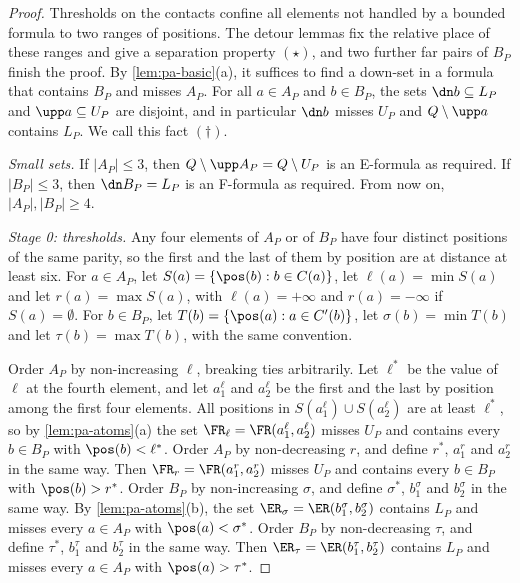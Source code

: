 \begin{proof}
Thresholds on the contacts confine all elements not handled by a bounded formula to two ranges of positions.
The detour lemmas fix the relative place of these ranges and give a separation property $(\star)$, and two further far pairs of $B_P$ finish the proof.
By \cref{lem:pa-basic}(a), it suffices to find a down-set in a formula that contains $B_P$ and misses $A_P$.
For all $a \in A_P$ and $b \in B_P$, the sets $\dn b \subseteq L_P$ and $\upp a \subseteq U_P$ are disjoint, and in particular $\dn b$ misses $U_P$ and $Q \setminus \upp a$ contains $L_P$.
We call this fact $(\dagger)$.

\emph{Small sets.}
If $|A_P| \leq 3$, then $Q \setminus \upp A_P = Q \setminus U_P$ is an E-formula as required.
If $|B_P| \leq 3$, then $\dn B_P = L_P$ is an F-formula as required.
From now on, $|A_P|, |B_P| \geq 4$.

\emph{Stage 0: thresholds.}
Any four elements of $A_P$ or of $B_P$ have four distinct positions of the same parity, so the first and the last of them by position are at distance at least six.
For $a \in A_P$, let $S(a) = \{\pos(b) : b \in C(a)\}$, let $\ell(a) = \min S(a)$ and let $r(a) = \max S(a)$, with $\ell(a) = +\infty$ and $r(a) = -\infty$ if $S(a) = \emptyset$.
For $b \in B_P$, let $T(b) = \{\pos(a) : a \in C'(b)\}$, let $\sigma(b) = \min T(b)$ and let $\tau(b) = \max T(b)$, with the same convention.

Order $A_P$ by non-increasing $\ell$, breaking ties arbitrarily.
Let $\ell^*$ be the value of $\ell$ at the fourth element, and let $a^\ell_1$ and $a^\ell_2$ be the first and the last by position among the first four elements.
All positions in $S(a^\ell_1) \cup S(a^\ell_2)$ are at least $\ell^*$, so by \cref{lem:pa-atoms}(a) the set $\FR_\ell = \FR(a^\ell_1, a^\ell_2)$ misses $U_P$ and contains every $b \in B_P$ with $\pos(b) < \ell^*$.
Order $A_P$ by non-decreasing $r$, and define $r^*$, $a^r_1$ and $a^r_2$ in the same way.
Then $\FR_r = \FR(a^r_1, a^r_2)$ misses $U_P$ and contains every $b \in B_P$ with $\pos(b) > r^*$.
Order $B_P$ by non-increasing $\sigma$, and define $\sigma^*$, $b^\sigma_1$ and $b^\sigma_2$ in the same way.
By \cref{lem:pa-atoms}(b), the set $\ER_\sigma = \ER(b^\sigma_1, b^\sigma_2)$ contains $L_P$ and misses every $a \in A_P$ with $\pos(a) < \sigma^*$.
Order $B_P$ by non-decreasing $\tau$, and define $\tau^*$, $b^\tau_1$ and $b^\tau_2$ in the same way.
Then $\ER_\tau = \ER(b^\tau_1, b^\tau_2)$ contains $L_P$ and misses every $a \in A_P$ with $\pos(a) > \tau^*$.


\end{proof}
